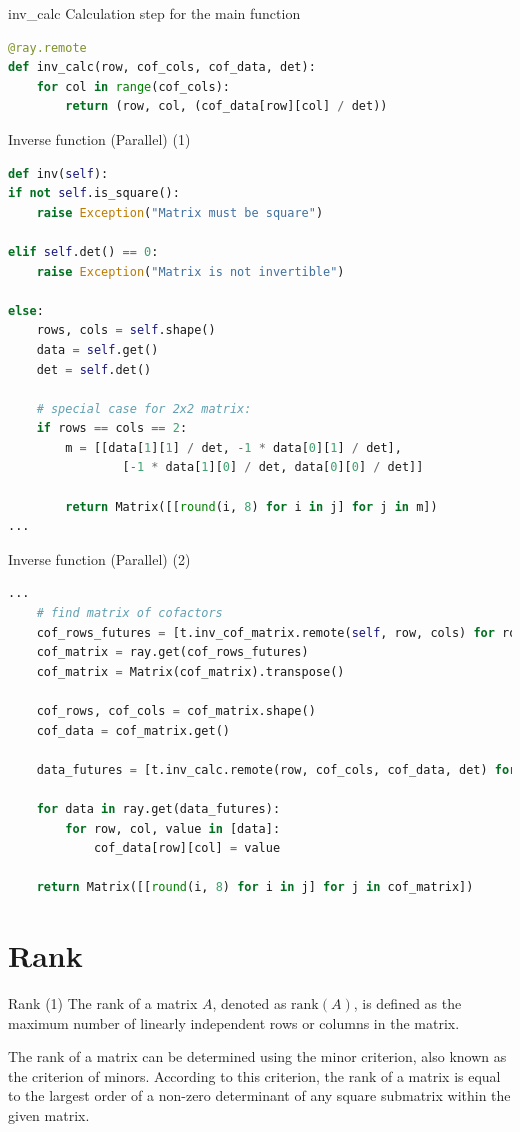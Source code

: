 \documentclass{beamer}
\begin{document}
\begin{frame}[fragile]{inv\_calc}
    Calculation step for the main function
    \begin{lstlisting}[language=Python]
@ray.remote
def inv_calc(row, cof_cols, cof_data, det):
    for col in range(cof_cols):
        return (row, col, (cof_data[row][col] / det))
        \end{lstlisting}
\end{frame}


\begin{frame}[fragile]{Inverse function (Parallel) (1)}
    \begin{lstlisting}[language=Python]
def inv(self):
if not self.is_square():
    raise Exception("Matrix must be square")

elif self.det() == 0:
    raise Exception("Matrix is not invertible")

else:
    rows, cols = self.shape()
    data = self.get()
    det = self.det()

    # special case for 2x2 matrix:
    if rows == cols == 2:
        m = [[data[1][1] / det, -1 * data[0][1] / det],
                [-1 * data[1][0] / det, data[0][0] / det]]

        return Matrix([[round(i, 8) for i in j] for j in m])
...    
            \end{lstlisting}
\end{frame}

\begin{frame}[fragile]{Inverse function (Parallel) (2)}
    \begin{lstlisting}[language=Python]
...
    # find matrix of cofactors
    cof_rows_futures = [t.inv_cof_matrix.remote(self, row, cols) for row in range(rows)]
    cof_matrix = ray.get(cof_rows_futures)
    cof_matrix = Matrix(cof_matrix).transpose()

    cof_rows, cof_cols = cof_matrix.shape()
    cof_data = cof_matrix.get()

    data_futures = [t.inv_calc.remote(row, cof_cols, cof_data, det) for row in range(cof_rows)]

    for data in ray.get(data_futures):
        for row, col, value in [data]:
            cof_data[row][col] = value

    return Matrix([[round(i, 8) for i in j] for j in cof_matrix])
            \end{lstlisting}
\end{frame}

\section{Rank}
\begin{frame}{Rank (1)}
    The \alert{rank} of a matrix $A$, denoted as $\text{rank}(A)$, is defined as the maximum number of linearly independent rows or columns in the matrix.

    The rank of a matrix can be determined using the minor criterion, also known as the \alert{criterion of minors}. According to this criterion, the rank of a matrix is equal to the largest order of a non-zero determinant of any square submatrix within the given matrix.
\end{frame}
\end{document}
